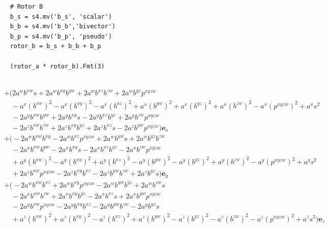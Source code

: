 \documentclass{l4proj}
\begin{document}
\begin{appendices}
\begin{lstlisting}
    # Rotor B
    b_s = s4.mv('b_s', 'scalar')
    b_b = s4.mv('b_b','bivector')
    b_p = s4.mv('b_p', 'pseudo')
    rotor_b = b_s + b_b + b_p
  
    (rotor_a * rotor_b).Fmt(3)
  
\end{lstlisting}

\begin{equation} 
  \begin{aligned}
    \label{eq:rotate_vec} 
  & + \Big( 2 a^{w} b^{xw} s + 2 a^{w} b^{xy} b^{yw} + 2 a^{w} b^{xz} b^{zw} + 2 a^{w} b^{yz} p^{xyzw} \\
  & \quad - a^{x} {\left ( b^{xw} \right )}^{2} - a^{x} {\left ( b^{xy} \right )}^{2} - a^{x} {\left ( b^{xz} \right )}^{2} + a^{x} {\left ( b^{yw} \right )}^{2} + a^{x} {\left ( b^{yz} \right )}^{2} + a^{x} {\left ( b^{zw} \right )}^{2} - a^{x} {\left ( p^{xyzw} \right )}^{2} + a^{x} s^{2} \\
  & \quad - 2 a^{y} b^{xw} b^{yw} + 2 a^{y} b^{xy} s - 2 a^{y} b^{xz} b^{yz} + 2 a^{y} b^{zw} p^{xyzw} \\
  & \quad - 2 a^{z} b^{xw} b^{zw} + 2 a^{z} b^{xy} b^{yz} + 2 a^{z} b^{xz} s - 2 a^{z} b^{yw} p^{xyzw} \Big) \boldsymbol{e}_{x} \\
  & + \Big( - 2 a^{w} b^{xw} b^{xy} - 2 a^{w} b^{xz} p^{xyzw} + 2 a^{w} b^{yw} s + 2 a^{w} b^{yz} b^{zw} \\
  & \quad - 2 a^{x} b^{xw} b^{yw} - 2 a^{x} b^{xy} s - 2 a^{x} b^{xz} b^{yz} - 2 a^{x} b^{zw} p^{xyzw} \\
  & \quad + a^{y} {\left ( b^{xw} \right )}^{2} - a^{y} {\left ( b^{xy} \right )}^{2} + a^{y} {\left ( b^{xz} \right )}^{2} - a^{y} {\left ( b^{yw} \right )}^{2} - a^{y} {\left ( b^{yz} \right )}^{2} + a^{y} {\left ( b^{zw} \right )}^{2} - a^{y} {\left ( p^{xyzw} \right )}^{2} + a^{y} s^{2} \\
  & \quad + 2 a^{z} b^{xw} p^{xyzw} - 2 a^{z} b^{xy} b^{xz} - 2 a^{z} b^{yw} b^{zw} + 2 a^{z} b^{yz} s \Big) \boldsymbol{e}_{y} \\
  & + \Big( - 2 a^{w} b^{xw} b^{xz} + 2 a^{w} b^{xy} p^{xyzw} - 2 a^{w} b^{yw} b^{yz} + 2 a^{w} b^{zw} s \\ 
  & \quad - 2 a^{x} b^{xw} b^{zw} + 2 a^{x} b^{xy} b^{yz} - 2 a^{x} b^{xz} s + 2 a^{x} b^{yw} p^{xyzw} \\
  & \quad - 2 a^{y} b^{xw} p^{xyzw} - 2 a^{y} b^{xy} b^{xz} - 2 a^{y} b^{yw} b^{zw} - 2 a^{y} b^{yz} s \\
  & \quad + a^{z} {\left ( b^{xw} \right )}^{2} + a^{z} {\left ( b^{xy} \right )}^{2} - a^{z} {\left ( b^{xz} \right )}^{2} + a^{z} {\left ( b^{yw} \right )}^{2} - a^{z} {\left ( b^{yz} \right )}^{2} - a^{z} {\left ( b^{zw} \right )}^{2} - a^{z} {\left ( p^{xyzw} \right )}^{2} + a^{z} s^{2} \Big) \boldsymbol{e}_{z} \\

\end{aligned}
\end{equation}
\end{appendices}
\end{document}
